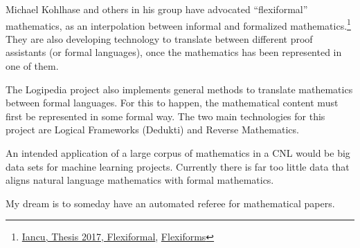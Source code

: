 \documentclass[12pt]{amsart}
\renewcommand{\~}{\ }
\renewcommand{\_}{\textunderscore}
\begin{document}
Michael Kohlhase and others in his group have advocated
``flexiformal'' mathematics, as an interpolation between informal and
formalized
mathematics.\footnote{\href{https://d-nb.info/1141379643/34}{Iancu,
    Thesis 2017, Flexiformal},
  \href{https://github.com/MathHubInfo/Documentation/wiki/FlexiForms}{Flexiforms}}
They are also developing technology to translate between different
proof assistants (or formal languages), once the mathematics has been
represented in one of them.

The Logipedia project also implements general methods to translate
mathematics between formal languages. For this to happen, the
mathematical content must first be represented in some formal way.
The two main technologies for this project are Logical Frameworks
(Dedukti) and Reverse Mathematics.

An intended application of a large corpus of mathematics in a CNL
would be big data sets for machine learning projects.  Currently there
is far too little data that aligns natural language mathematics with
formal mathematics.




% 

My dream is to someday have an automated referee for mathematical papers.
\end{document}
